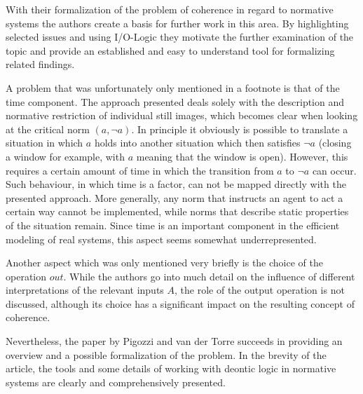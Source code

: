 \documentclass[12pt]{article}
\begin{document}
With their formalization of the problem of coherence in regard to normative systems the authors create a basis for further work in this area. By highlighting selected issues and using I/O-Logic they motivate the further examination of the topic and provide an established and easy to understand tool for formalizing related findings. 

A problem that was unfortunately only mentioned in a footnote is that of the time component. The approach presented deals solely with the description and normative restriction of individual still images, which becomes clear when looking at the critical norm $(a, \neg a)$. In principle it obviously is possible to translate a situation in which $a$ holds into another situation which then satisfies $\neg a$ (closing a window for example, with $a$ meaning that the window is open). However, this requires a certain amount of time in which the transition from $a$ to $\neg a$ can occur. Such behaviour, in which time is a factor, can not be mapped directly with the presented approach. More generally, any norm that instructs an agent to act a certain way cannot be implemented, while norms that describe static properties of the situation remain. Since time is an important component in the efficient modeling of real systems, this aspect seems somewhat underrepresented.

Another aspect which was only mentioned very briefly is the choice of the operation $\mathit{out}$. While the authors go into much detail on the influence of different interpretations of the relevant inputs $A$,  the role of the output operation is not discussed, although its choice has a significant impact on the resulting concept of coherence.

Nevertheless, the paper by Pigozzi and van der Torre succeeds in providing an overview and a possible formalization of the problem. In the brevity of the article, the tools and some details of working with deontic logic in normative systems are clearly and comprehensively presented.



\end{document}
